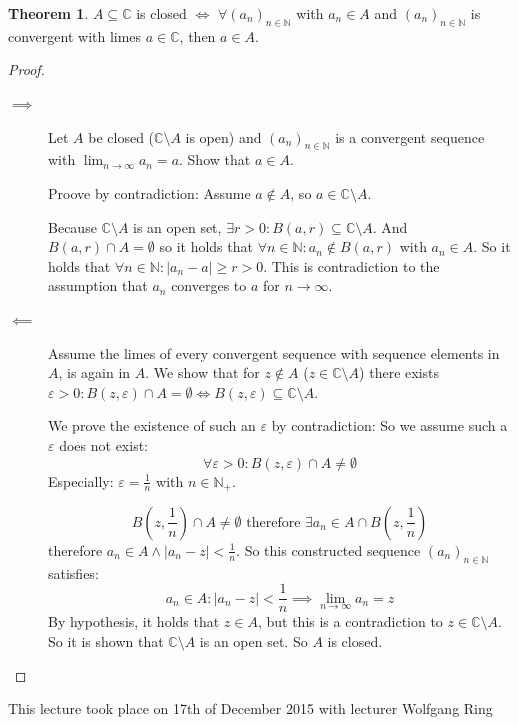 \documentclass[a4paper,landscape,twocolumn]{article}
\theoremstyle{definition}
\newtheorem{theorem}{Theorem}
\newcommand\abs[1]{\left|#1\right|}
\newcommand\seq[1]{{\left(#1\right)}_{n \in \mathbb N}}
\newcommand\meta[3]{\begin{mdframed}[skipbelow=4pt,skipabove=4pt,innermargin=1pt,innerleftmargin=1pt,innerrightmargin=1pt]\begin{center}\small{\textdownarrow{} This #1 took place on #2 with lecturer #3}\end{center}\end{mdframed}}
\begin{document}
\begin{theorem}
  $A \subseteq \mathbb C$ is closed $\iff$ $\forall \seq{a_n}$ with $a_n \in A$ and $\seq{a_n}$
  is convergent with limes $a \in \mathbb C$, then $a \in A$.
\end{theorem}
\begin{proof}
  \begin{description}
    \item[$\implies$]
      Let $A$ be closed ($\mathbb C \setminus A$ is open) and $\seq{a_n}$ is a convergent sequence with $\lim_{n\to\infty} a_n = a$.
      Show that $a \in A$.

      Proove by contradiction: Assume $a \not\in A$, so $a \in \mathbb C \setminus A$.

      Because $\mathbb C \setminus A$ is an open set, $\exists r > 0: B(a, r) \subseteq \mathbb C \setminus A$.
      And $B(a, r) \cap A = \emptyset$ so it holds that $\forall n \in \mathbb N: a_n \not\in B(a, r)$ with $a_n \in A$.
      So it holds that $\forall n \in \mathbb N: \abs{a_n - a} \geq r > 0$. This is contradiction to the assumption
      that $a_n$ converges to $a$ for $n \to \infty$.
    \item[$\impliedby$]
      Assume the limes of every convergent sequence with sequence elements in $A$,
      is again in $A$. We show that for $z \not\in A$ ($z \in \mathbb C \setminus A$)
      there exists $\varepsilon > 0: B(z, \varepsilon) \cap A = \emptyset \iff B(z, \varepsilon) \subseteq \mathbb C \setminus A$.

      We prove the existence of such an $\varepsilon$ by contradiction:
      So we assume such a $\varepsilon$ does not exist:
      \[ \forall \varepsilon > 0: B(z, \varepsilon) \cap A \neq \emptyset \]
      Especially: $\varepsilon = \frac1{n}$ with $n \in \mathbb N_+$.

      \[ B(z, \frac1n) \cap A \neq \emptyset \text{ therefore } \exists a_n \in A \cap B(z, \frac1n) \]
      therefore $a_n \in A \land \abs{a_n - z} < \frac1n$.
      So this constructed sequence $\seq{a_n}$ satisfies:
      \[ a_n \in A: \abs{a_n - z} < \frac1n \implies \lim_{n\to\infty} a_n = z \]
      By hypothesis, it holds that $z \in A$, but this is a contradiction to $z \in \mathbb C \setminus A$.
      So it is shown that $\mathbb C \setminus A$ is an open set. So $A$ is closed.
  \end{description}
\end{proof}

\meta{lecture}{17th of December 2015}{Wolfgang Ring}
\end{document}
